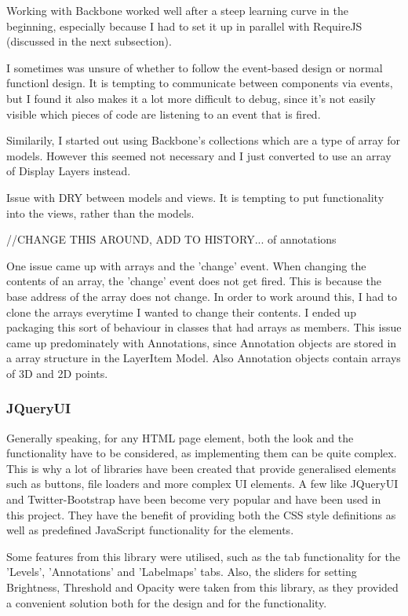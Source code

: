 \documentclass[a4paper,11pt,titlepage]{article}
\begin{document}
Working with Backbone worked well after a steep learning curve in the beginning, especially because I had to set it up in parallel with RequireJS (discussed in the next subsection).

I sometimes was unsure of whether to follow the event-based design or normal functionl design. It is tempting to communicate between components via events, but I found it also makes it a lot more difficult to debug, since it's not easily visible which pieces of code are listening to an event that is fired.

Similarily, I started out using Backbone's collections which are a type of array for models. However this seemed not necessary and I just converted to use an array of Display Layers instead.

Issue with DRY between models and views. It is tempting to put functionality into the views, rather than the models.

//CHANGE THIS AROUND, ADD TO HISTORY... of annotations

One issue came up with arrays and the 'change' event. When changing the contents of an array, the 'change' event does not get fired. This is because the base address of the array does not change. In order to work around this, I had to clone the arrays everytime I wanted to change their contents. I ended up packaging this sort of behaviour in classes that had arrays as members. This issue came up predominately with Annotations, since Annotation objects are stored in a array structure in the LayerItem Model. Also Annotation objects contain arrays of 3D and 2D points.






\subsubsection{JQueryUI}

Generally speaking, for any HTML page element, both the look and the functionality have to be considered, as implementing them can be quite complex. This is why a lot of libraries have been created that provide generalised elements such as buttons, file loaders and more complex UI elements. A few like JQueryUI and Twitter-Bootstrap have been become very popular and have been used in this project. They have the benefit of providing both the CSS style definitions as well as predefined JavaScript functionality for the elements. 

Some features from this library were utilised, such as the tab functionality for the 'Levels', 'Annotations' and 'Labelmaps' tabs. Also, the sliders for setting Brightness, Threshold and Opacity were taken from this library, as they provided a convenient solution both for the design and for the functionality.
\end{document}
